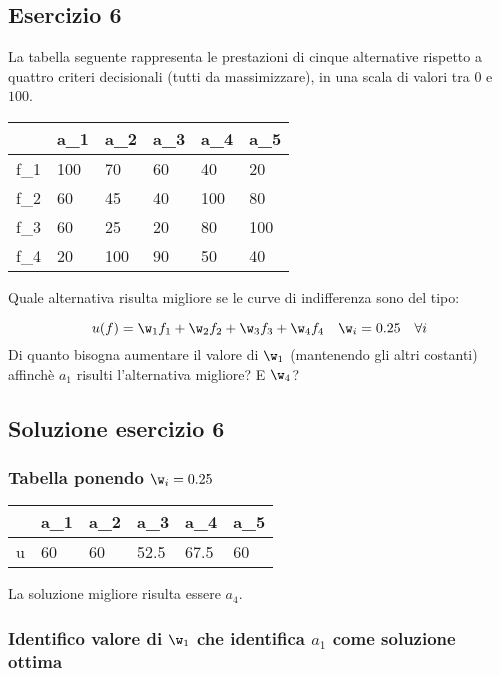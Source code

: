 \documentclass[\main/main.tex]{subfiles}
\begin{document}
\subsection{Esercizio 6}
La tabella seguente rappresenta le prestazioni di cinque alternative rispetto a quattro criteri decisionali (tutti da massimizzare), in una scala di valori tra $0$ e $100$.

\begin{table}
  \begin{tabular}{L|LLLLL}
        & a_1 & a_2 & a_3 & a_4 & a_5 \\
    \hline
    f_1 & 100 & 70  & 60  & 40  & 20  \\
    f_2 & 60  & 45  & 40  & 100 & 80  \\
    f_3 & 60  & 25  & 20  & 80  & 100 \\
    f_4 & 20  & 100 & 90  & 50  & 40
  \end{tabular}
\end{table}

Quale alternativa risulta migliore se le curve di indifferenza sono del tipo:

\[
  u(f) = \w_1f_1 + \w_2f_2 + \w_3f_3 + \w_4f_4 \quad \w_i = 0.25 \quad \forall i
\]
Di quanto bisogna aumentare il valore di $\w_1$ (mantenendo gli altri costanti) affinchè $a_1$ risulti l'alternativa migliore? E $\w_4$?

\subsection{Soluzione esercizio 6}

\subsubsection*{Tabella ponendo $\w_i=0.25$}

\begin{table}
  \begin{tabular}{L|LLLLL}
      & a_1 & a_2 & a_3  & a_4  & a_5 \\
    \hline
    u & 60  & 60  & 52.5 & 67.5 & 60  \\
  \end{tabular}
\end{table}

La soluzione migliore risulta essere $a_4$.

\subsubsection*{Identifico valore di $\w_1$ che identifica $a_1$ come soluzione ottima}
\end{document}
